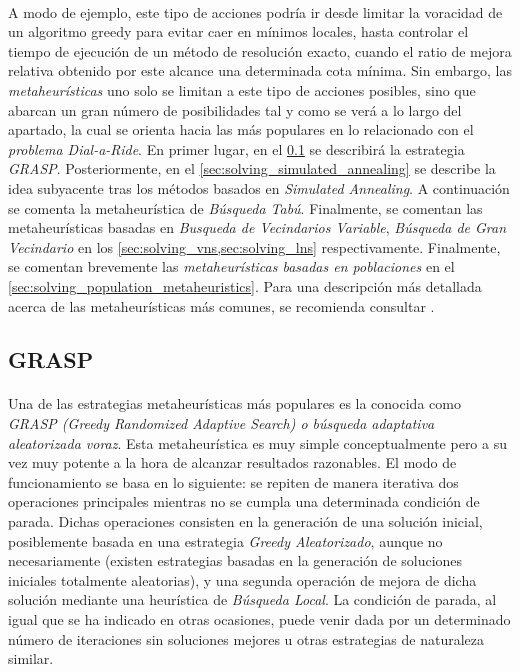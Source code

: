 \documentclass{subfiles}
\begin{document}
      \paragraph{}
      A modo de ejemplo, este tipo de acciones podría ir desde limitar la voracidad de un algoritmo greedy para evitar caer en mínimos locales, hasta controlar el tiempo de ejecución de un método de resolución exacto, cuando el ratio de mejora relativa obtenido por este alcance una determinada cota mínima. Sin embargo, las \emph{metaheurísticas} uno solo se limitan a este tipo de acciones posibles, sino que abarcan un gran número de posibilidades tal y como se verá a lo largo del apartado, la cual se orienta hacia las más populares en lo relacionado con el \emph{problema Dial-a-Ride}. En primer lugar, en el \cref{sec:solving_grasp} se describirá la estrategia \emph{GRASP}. Posteriormente, en el \cref{sec:solving_simulated_annealing} se describe la idea subyacente tras los métodos basados en \emph{Simulated Annealing}. A continuación se comenta la metaheurística de \emph{Búsqueda Tabú}. Finalmente, se comentan las metaheurísticas basadas en \emph{Busqueda de Vecindarios Variable}, \emph{Búsqueda de Gran Vecindario} en los \cref{sec:solving_vns,sec:solving_lns} respectivamente. Finalmente, se comentan brevemente las \emph{metaheurísticas basadas en poblaciones} en el \cref{sec:solving_population_metaheuristics}. Para una descripción más detallada acerca de las metaheurísticas más comunes, se recomienda consultar \cite{blum2003metaheuristics,glover2006handbook,boussaid2013survey,ho2018survey}.

      \subsection{GRASP}
      \label{sec:solving_grasp}

        \paragraph{}
        Una de las estrategias metaheurísticas más populares es la conocida como \emph{GRASP (Greedy Randomized Adaptive Search) o búsqueda adaptativa aleatorizada voraz}. Esta metaheurística es muy simple conceptualmente pero a su vez muy potente a la hora de alcanzar resultados razonables. El modo de funcionamiento se basa en lo siguiente: se repiten de manera iterativa dos operaciones principales mientras no se cumpla una determinada condición de parada. Dichas operaciones consisten en la generación de una solución inicial, posiblemente basada en una estrategia \emph{Greedy Aleatorizado}, aunque no necesariamente (existen estrategias basadas en la generación de soluciones iniciales totalmente aleatorias), y una segunda operación de mejora de dicha solución mediante una heurística de \emph{Búsqueda Local}. La condición de parada, al igual que se ha indicado en otras ocasiones, puede venir dada por un determinado número de iteraciones sin soluciones mejores u otras estrategias de naturaleza similar.
\end{document}
